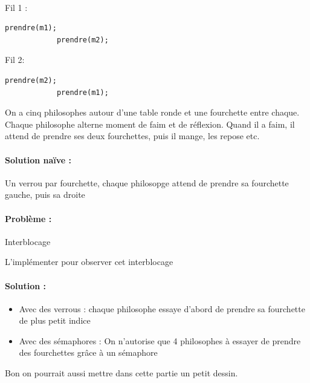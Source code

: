 \begin{example} \enspace\\ \normalfont
	\begin{minipage}{0.3\linewidth}
		Fil 1 :
		\begin{lstlisting}[style=CStyle]
			prendre(m1);
			prendre(m2);\end{lstlisting}
	\end{minipage} \quad
	\begin{minipage}{0.3\linewidth}
		Fil 2:
		\begin{lstlisting}[style=CStyle]
			prendre(m2);
			prendre(m1);\end{lstlisting}
	\end{minipage}
\end{example}

\begin{definition}
	On a cinq philosophes autour d'une table ronde et une fourchette entre chaque. Chaque philosophe alterne moment de faim et de réflexion. Quand il a faim, il attend de prendre ses deux fourchettes, puis il mange, les repose etc.
\end{definition}

\paragraph{Solution naïve :} Un verrou par fourchette, chaque philosopge attend de prendre sa fourchette gauche, puis sa droite

\paragraph{Problème :} Interblocage

\begin{exercise}
	L'implémenter pour observer cet interblocage
\end{exercise}

\paragraph{Solution :} \begin{itemize}
	\item Avec des verrous : chaque philosophe essaye d'abord de prendre sa fourchette de plus petit indice
	\item Avec des sémaphores : On n'autorise que 4 philosophes à essayer de prendre des fourchettes grâce à un sémaphore
\end{itemize}

\begin{com}
	Bon on pourrait aussi mettre dans cette partie un petit dessin.
\end{com}